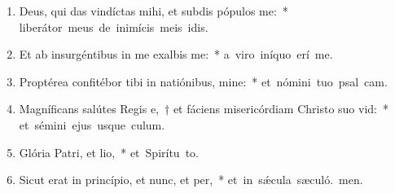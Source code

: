 \begin{flushleft}
\begin{enumerate}[leftmargin=*]
\item Deus, qui das vindíctas mihi, et subdis pópulos  me:~* \mbox{liberátor meus de inimícis meis idis.}

\item Et ab insurgéntibus in me exalbis me:~* \mbox{a viro iníquo erí me.}

\item Proptérea confitébor tibi in natiónibus, mine:~* \mbox{et nómini tuo psal cam.}

\item Magníficans salútes Regis e,~† et fáciens misericórdiam Christo suo vid:~* \mbox{et sémini ejus usque  culum.}

\item Glória Patri, et lio,~* \mbox{et Spirítu to.}

\item Sicut erat in princípio, et nunc, et per,~* \mbox{et in sǽcula sæculó. men.}

\end{enumerate}
\end{flushleft}

